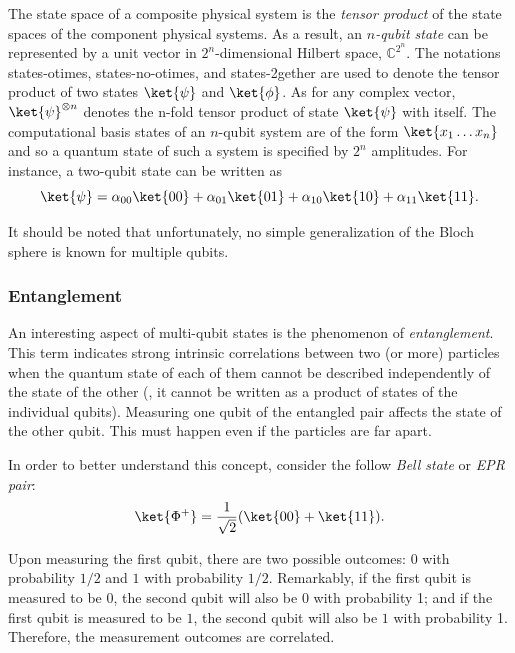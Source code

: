 \begin{definition}
 The state space of a composite physical system is the \emph{tensor product} of the state spaces of the component physical systems. As a result, an $n$\emph{-qubit state} can be represented by a unit vector in $2^n$-dimensional Hilbert space, $\mathbb{C}^{2^{n}}$. The notations \gls{states-otimes}, \gls{states-no-otimes}, and \gls{states-2gether} are  used to denote the tensor product of two states $\ket{\psi}$ and $\ket{\phi}$. As for any complex vector, $\ket{\psi}^{\otimes n}$ denotes the n-fold tensor product of state $\ket{\psi}$ with itself. The computational basis states of an $n$-qubit system are of the form $\ket{x_{1}\ldots x_{n}}$ and so a quantum state of such a system is specified by $2^{n}$ amplitudes. For instance, a two-qubit state can be written as
\begin{equation*}
  \ket{\psi} = \alpha_{00}\ket{00} + \alpha_{01}\ket{01} + \alpha_{10}\ket{10} + \alpha_{11}\ket{11}.
\end{equation*}
\end{definition}
It should be noted that unfortunately, no simple generalization of the Bloch sphere is known for multiple qubits.


\subsubsection{Entanglement}

\begin{definition}
  An interesting aspect of multi-qubit states is the phenomenon of \emph{entanglement}. This term indicates strong intrinsic correlations between two (or more) particles when the quantum state of each of them cannot be described independently of the state of the other (\ie, it cannot be written as a product of states of the individual qubits). Measuring one qubit of the entangled pair affects the state of the other qubit. This must happen even if the particles are far apart.
\end{definition}

In order to better understand this concept, consider the follow \emph{Bell state} or \emph{EPR pair}:
\begin{equation*}
  \ket{\Phi^{+}} = \frac{1}{\sqrt{2}}(\ket{00} + \ket{11}).
\end{equation*}

Upon measuring the first qubit, there are two possible outcomes: $0$ with probability $1/2$ and $1$ with probability $1/2$. Remarkably, if the first qubit is measured to be $0$, the second qubit will also be $0$ with probability 1; and if the first qubit is measured to be $1$, the second qubit will also be $1$ with probability 1. Therefore, the measurement outcomes are correlated.

